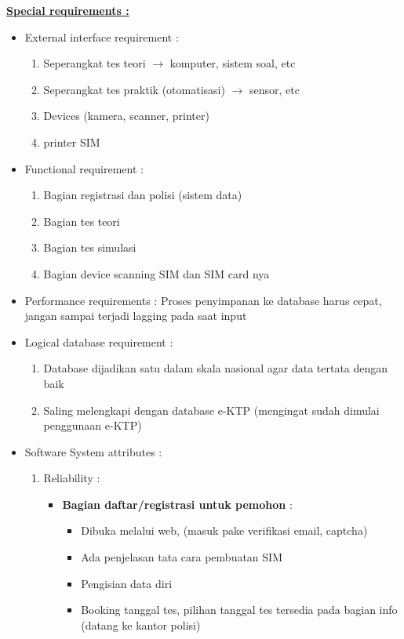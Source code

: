 \documentclass[paper=a4, fontsize=11pt]{scrartcl}
\numberwithin{equation}{section} %
\numberwithin{figure}{section} %
\numberwithin{table}{section} %
\begin{document}
\underline{\textbf{Special requirements :}}
\begin{itemize}
	\item External interface requirement :
	\begin{enumerate}
		\item Seperangkat tes teori $ \rightarrow $ komputer, sistem soal, etc
		\item Seperangkat tes praktik (otomatisasi) $ \rightarrow $ sensor, etc
		\item Devices (kamera, scanner, printer)
		\item printer SIM
	\end{enumerate}
	\item Functional requirement :
	\begin{enumerate}
		\item Bagian registrasi dan polisi (sistem data)
		\item Bagian tes teori
		\item Bagian tes simulasi
		\item Bagian device scanning SIM dan SIM card nya
	\end{enumerate}
	\item Performance requirements : Proses penyimpanan ke database harus cepat, jangan sampai terjadi lagging pada saat input
	\item Logical database requirement :
	\begin{enumerate}
		\item Database dijadikan satu dalam skala nasional agar data tertata dengan baik
		\item Saling melengkapi dengan database e-KTP (mengingat sudah dimulai penggunaan e-KTP)
	\end{enumerate}
	\item Software System attributes :
	\begin{enumerate}
		\item Reliability :
		\begin{itemize}
			\item \textbf{Bagian daftar/registrasi untuk pemohon} :
			\begin{itemize}
				\item Dibuka melalui web, (masuk pake verifikasi email, captcha)
				\item Ada penjelasan tata cara pembuatan SIM
				\item Pengisian data diri
				\item Booking tanggal tes, pilihan tanggal tes tersedia pada bagian info (datang ke kantor polisi)

\end{itemize}
\end{itemize}
\end{enumerate}
\end{itemize}
\end{document}
